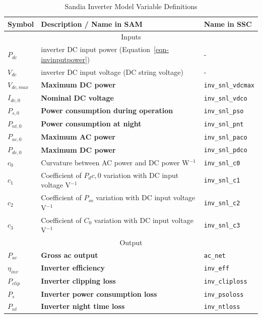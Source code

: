 \documentclass[12pt,letterpaper]{article}
\begin{document}
\begin{table}
\begin{center}
\caption{Sandia Inverter Model Variable Definitions}
\begin{tabular}{lll}
\midrule
Symbol & Description / \textbf{Name in SAM} & Name in SSC \\
\midrule
\multicolumn{3}{c}{Inputs}\\
$P_{dc}$ & inverter DC input power (Equation~\ref{eqn-invinputpower}) & - \\
$V_{dc}$ & inverter DC input voltage (DC string voltage) & - \\
$V_{dc,max}$ & \textbf{Maximum DC power} & \texttt{inv\_snl\_vdcmax} \\
$I_{dc,0}$ & \textbf{Nominal DC voltage} & \texttt{inv\_snl\_vdco} \\
$P_{s,0}$ & \textbf{Power consumption during operation} & \texttt{inv\_snl\_pso} \\
$P_{nt,0}$ & \textbf{Power consumption at night} & \texttt{inv\_snl\_pnt} \\
$P_{ac,0}$ & \textbf{Maximum AC power} & \texttt{inv\_snl\_paco} \\
$P_{dc,0}$ & \textbf{Maximum DC power} & \texttt{inv\_snl\_pdco} \\
$c_0$ & Curvature between AC power and DC power W$^{-1}$ & \texttt{inv\_snl\_c0} \\
$c_1$ & Coefficient of $P_dc,0$ variation with DC input voltage V$^{-1}$ &  \texttt{inv\_snl\_c1} \\
$c_2$ & Coefficient of $P_{so}$ variation with DC input voltage V$^{-1}$ &\texttt{inv\_snl\_c2} \\
$c_3$ & Coefficient of $C_0$ variation with DC input voltage V$^{-1}$ & \texttt{inv\_snl\_c3} \\
\midrule
\multicolumn{3}{c}{Output}\\
$P_{ac}$ & \textbf{Gross ac output} & \texttt{ac\_net} \\
$\eta_{inv}$ & \textbf{Inverter efficiency} & \texttt{inv\_eff}  \\
$P_{clip}$ & \textbf{Inverter clipping loss} & \texttt{inv\_cliploss}  \\
$P_{s}$ & \textbf{Inverter power consumption loss}& \texttt{inv\_psoloss}  \\
$P_{nt}$ & \textbf{Inverter night time loss}& \texttt{inv\_ntloss}  \\
\hline
\end{tabular}
\label{tab-sandiainvertervars}
\end{center}
\end{table}
\end{document}
